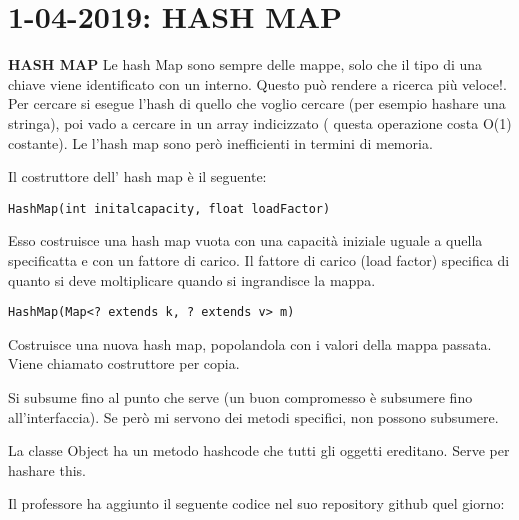 

\newpage
\section{1-04-2019: HASH MAP}
\textbf{HASH MAP} \newline
Le hash Map sono sempre delle mappe, solo che il tipo di una chiave viene identificato con un interno. Questo può rendere a ricerca più veloce!. \newline
Per cercare si esegue l'hash di quello che voglio cercare (per esempio hashare una stringa), poi vado a cercare in un array indicizzato ( questa operazione costa O(1) costante). \newline
Le l'hash map sono però inefficienti in termini di memoria. 

\noindent Il costruttore dell' hash map è il seguente: 
\begin{lstlisting}[basicstyle=\small,]
	HashMap(int initalcapacity, float loadFactor)
\end{lstlisting}
Esso costruisce una hash map vuota con una capacità iniziale uguale a quella specificatta e con un fattore di carico. Il fattore di carico (load factor) specifica di quanto si deve moltiplicare quando si ingrandisce la mappa. 
\begin{lstlisting}[basicstyle=\small,]
	HashMap(Map<? extends k, ? extends v> m)
\end{lstlisting}
Costruisce una nuova hash map, popolandola con i valori della mappa passata. Viene chiamato costruttore per copia.

\noindent Si subsume fino al punto che serve (un buon compromesso è subsumere fino all'interfaccia). Se però mi servono dei metodi specifici, non possono subsumere. 

\noindent La classe Object ha un metodo hashcode che tutti gli oggetti ereditano. Serve per hashare this.



\noindent Il professore ha aggiunto il seguente codice nel suo repository github quel giorno: 

